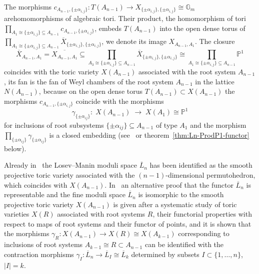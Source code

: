\documentclass[ALCO,ThmDefs,Unicode,epreuves]{cedram}
\def\G{\mathds G}
\def\P{\mathds P}
\begin{document}

The morphisms $c_{A_{n-1},\{\pm\alpha_{i,j}\}}\colon T(A_{n-1})\to
X_{\{\pm\alpha_{i,j}\},\{\pm\alpha_{i,j}\}}\cong\G_m$ are\linebreak homomorphisms of algebraic tori.
Their product, the homomorphism of tori 
$\prod_{A_1\cong\{\pm\alpha_{i,j}\}\subseteq A_{n-1}}c_{A_{n-1},\{\pm\alpha_{i,j}\}}$, 
embeds $T(A_{n-1})$ into the open dense torus of
$\prod_{A_1\cong\{\pm\alpha_{i,j}\}\subseteq A_{n-1}}
\overline{X}_{\{\pm\alpha_{i,j}\},\{\pm\alpha_{i,j}\}}$, we denote its image 
$X_{A_{n-1},A_1}$. The closure
\[\textstyle
\overline{X}_{A_{n-1},A_1}=\overline{X_{A_{n-1},A_1}}
\subseteq\prod_{A_3\cong\{\pm\alpha_{i,j}\}\subseteq A_{n-1}}
\!\overline{X}_{\{\pm\alpha_{i,j}\},\{\pm\alpha_{i,j}\}}
\cong\prod_{A_1\cong\{\pm\alpha_{i,j}\}\subseteq A_{n-1}}\!\P^1
\]
coincides with the toric variety $X(A_{n-1})$ associated with the root system $A_{n-1}$, 
\ie its fan is the fan of Weyl chambers of the root system $A_{n-1}$ in the 
lattice $N(A_{n-1})$, because on the open dense torus $T(A_{n-1})\subset X(A_{n-1})$ the 
morphisms $c_{A_{n-1},\{\pm\alpha_{i,j}\}}$ coincide with the morphisms 
\[
\gamma_{\{\pm\alpha_{ij}\}}\colon\;X(A_{n-1})\;\to\;X(A_1)\cong\P^1
\]
for inclusions of root subsystems $\{\pm\alpha_{ij}\}\subseteq A_{n-1}$ of 
type $A_1$ and the morphism $\prod_{\{\pm\alpha_{ij}\}}\gamma_{\{\pm\alpha_{ij}\}}$
is a closed embedding (see~\cite{BB11} or theorem~\ref{thm:Ln-ProdP1-functor} below).


Already in~\cite[(2.6.3)]{LM00} the Losev--Manin moduli space $\overline{L}_n$ 
has been identified as the smooth projective toric variety associated with 
the $(n-1)$-dimensional permutohedron, which coincides with $X(A_{n-1})$.
In~\cite{BB11} an alternative proof that the functor $\overline{L}_n$ is 
representable and the fine moduli space $\overline{L}_n$ is isomorphic to 
the smooth projective toric variety $X(A_{n-1})$ is given after a systematic study of 
toric varieties $X(R)$ associated with root systems $R$, their functorial properties 
with respect to maps of root systems and their functor of points, and it is shown that 
the morphisms $\gamma_R\colon X(A_{n-1})\to X(R)\cong X(A_{k-1})$ corresponding to 
inclusions of root systems $A_{k-1}\cong R\subset A_{n-1}$ can be identified with the 
contraction morphisms $\gamma_I\colon\overline{L}_n\to\overline{L}_I\cong\overline{L}_{k}$ 
determined by subsets $I\subset\{1,\ldots,n\}$, $|I|=k$.
\end{document}
